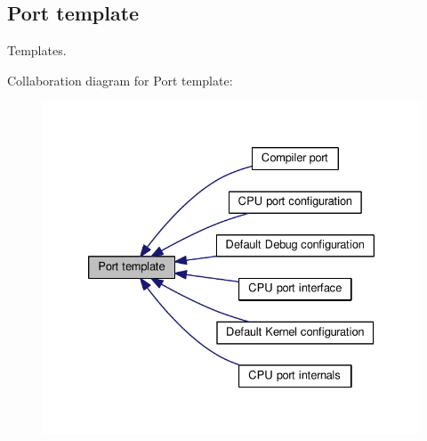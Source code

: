 \hypertarget{group__template}{\subsection{Port template}
\label{group__template}
}


Templates.  


Collaboration diagram for Port template\-:\nopagebreak
\begin{figure}[H]
\begin{center}
\leavevmode
\includegraphics[width=330pt]{group__template}
\end{center}
\end{figure}
